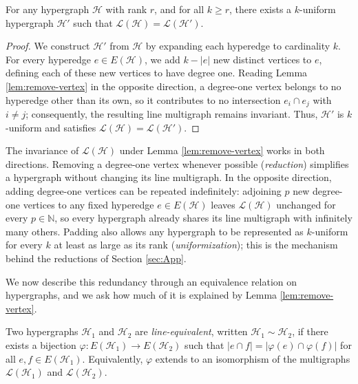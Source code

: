 \documentclass[12pt,reqno]{amsart}
\begin{document}
\begin{corollary}\label{cor:uniform_representation}
For any hypergraph $\mathcal{H}$ with rank $r$, and for all $k \geq r$, there exists a $k$-uniform hypergraph $\mathcal{H}'$ such that $\mathcal{L}(\mathcal{H}) = \mathcal{L}(\mathcal{H}')$. 
\end{corollary}
\begin{proof}
We construct $\mathcal{H}'$ from $\mathcal{H}$ by expanding each hyperedge to cardinality $k$. For every hyperedge $e \in E(\mathcal{H})$, we add $k - |e|$ new distinct vertices to $e$, defining each of these new vertices to have degree one. Reading Lemma \ref{lem:remove-vertex} in the opposite direction, a degree-one vertex belongs to no hyperedge other than its own, so it contributes to no intersection $e_i \cap e_j$ with $i \neq j$; consequently, the resulting line multigraph remains invariant. Thus, $\mathcal{H}'$ is $k$-uniform and satisfies $\mathcal{L}(\mathcal{H}) = \mathcal{L}(\mathcal{H}')$.
\end{proof}

\begin{remark}\label{rem:redundancy}
The invariance of $\mathcal{L}(\mathcal{H})$ under Lemma \ref{lem:remove-vertex} works in both directions. Removing a degree-one vertex whenever possible (\textit{reduction}) simplifies a hypergraph without changing its line multigraph. In the opposite direction, adding degree-one vertices can be repeated indefinitely: adjoining $p$ new degree-one vertices to any fixed hyperedge $e \in E(\mathcal{H})$ leaves $\mathcal{L}(\mathcal{H})$ unchanged for every $p \in \mathbb{N}$, so every hypergraph already shares its line multigraph with infinitely many others. Padding also allows any hypergraph to be represented as $k$-uniform for every $k$ at least as large as its rank (\textit{uniformization}); this is the mechanism behind the reductions of Section \ref{sec:App}.
\end{remark}

We now describe this redundancy through an equivalence relation on hypergraphs, and we ask how much of it is explained by Lemma \ref{lem:remove-vertex}.

\begin{definition}\label{def:line_equiv}
Two hypergraphs $\mathcal{H}_1$ and $\mathcal{H}_2$ are \textit{line-equivalent}, written $\mathcal{H}_1 \sim \mathcal{H}_2$, if there exists a bijection $\varphi: E(\mathcal{H}_1) \to E(\mathcal{H}_2)$ such that $|e \cap f| = |\varphi(e) \cap \varphi(f)|$ for all $e, f \in E(\mathcal{H}_1)$. Equivalently, $\varphi$ extends to an isomorphism of the multigraphs $\mathcal{L}(\mathcal{H}_1)$ and $\mathcal{L}(\mathcal{H}_2)$.
\end{definition}
\end{document}
